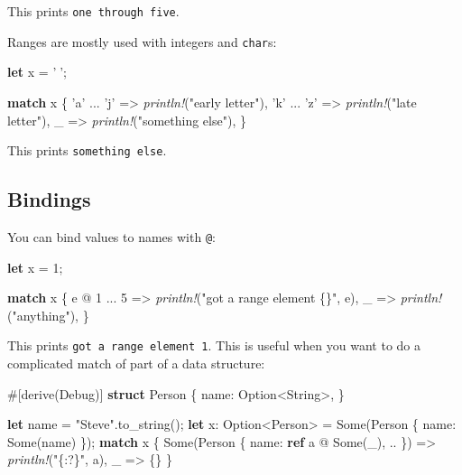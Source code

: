\documentclass[a4paper,]{book}
\newenvironment{Shaded}{\begin{snugshade}}{\end{snugshade}}
\newcommand{\KeywordTok}[1]{\textcolor[rgb]{0.13,0.29,0.53}{\textbf{{#1}}}}
\newcommand{\DataTypeTok}[1]{\textcolor[rgb]{0.13,0.29,0.53}{{#1}}}
\newcommand{\DecValTok}[1]{\textcolor[rgb]{0.00,0.00,0.81}{{#1}}}
\newcommand{\ConstantTok}[1]{\textcolor[rgb]{0.00,0.00,0.00}{{#1}}}
\newcommand{\CharTok}[1]{\textcolor[rgb]{0.31,0.60,0.02}{{#1}}}
\newcommand{\StringTok}[1]{\textcolor[rgb]{0.31,0.60,0.02}{{#1}}}
\newcommand{\BuiltInTok}[1]{{#1}}
\newcommand{\PreprocessorTok}[1]{\textcolor[rgb]{0.56,0.35,0.01}{\textit{{#1}}}}
\newcommand{\AttributeTok}[1]{\textcolor[rgb]{0.77,0.63,0.00}{{#1}}}
\newcommand{\NormalTok}[1]{{#1}}
\begin{document}
This prints \texttt{one\ through\ five}.

Ranges are mostly used with integers and \texttt{char}s:

\begin{Shaded}
\begin{Highlighting}[]
\KeywordTok{let} \NormalTok{x = }\CharTok{'💅'}\NormalTok{;}

\KeywordTok{match} \NormalTok{x \{}
    \CharTok{'a'} \NormalTok{... }\CharTok{'j'} \NormalTok{=> }\PreprocessorTok{println!}\NormalTok{(}\StringTok{"early letter"}\NormalTok{),}
    \CharTok{'k'} \NormalTok{... }\CharTok{'z'} \NormalTok{=> }\PreprocessorTok{println!}\NormalTok{(}\StringTok{"late letter"}\NormalTok{),}
    \NormalTok{_ => }\PreprocessorTok{println!}\NormalTok{(}\StringTok{"something else"}\NormalTok{),}
\NormalTok{\}}
\end{Highlighting}
\end{Shaded}

This prints \texttt{something\ else}.

\subsection{Bindings}\label{bindings}

You can bind values to names with \texttt{@}:

\begin{Shaded}
\begin{Highlighting}[]
\KeywordTok{let} \NormalTok{x = }\DecValTok{1}\NormalTok{;}

\KeywordTok{match} \NormalTok{x \{}
    \NormalTok{e @ }\DecValTok{1} \NormalTok{... }\DecValTok{5} \NormalTok{=> }\PreprocessorTok{println!}\NormalTok{(}\StringTok{"got a range element \{\}"}\NormalTok{, e),}
    \NormalTok{_ => }\PreprocessorTok{println!}\NormalTok{(}\StringTok{"anything"}\NormalTok{),}
\NormalTok{\}}
\end{Highlighting}
\end{Shaded}

This prints \texttt{got\ a\ range\ element\ 1}. This is useful when you
want to do a complicated match of part of a data structure:

\begin{Shaded}
\begin{Highlighting}[]
\AttributeTok{#[}\NormalTok{derive}\AttributeTok{(}\BuiltInTok{Debug}\AttributeTok{)]}
\KeywordTok{struct} \NormalTok{Person \{}
    \NormalTok{name: }\DataTypeTok{Option}\NormalTok{<}\DataTypeTok{String}\NormalTok{>,}
\NormalTok{\}}

\KeywordTok{let} \NormalTok{name = }\StringTok{"Steve"}\NormalTok{.to_string();}
\KeywordTok{let} \NormalTok{x: }\DataTypeTok{Option}\NormalTok{<Person> = }\ConstantTok{Some}\NormalTok{(Person \{ name: }\ConstantTok{Some}\NormalTok{(name) \});}
\KeywordTok{match} \NormalTok{x \{}
    \ConstantTok{Some}\NormalTok{(Person \{ name: }\KeywordTok{ref} \NormalTok{a @ }\ConstantTok{Some}\NormalTok{(_), .. \}) => }\PreprocessorTok{println!}\NormalTok{(}\StringTok{"\{:?\}"}\NormalTok{, a),}
    \NormalTok{_ => \{\}}
\NormalTok{\}}
\end{Highlighting}
\end{Shaded}
\end{document}
